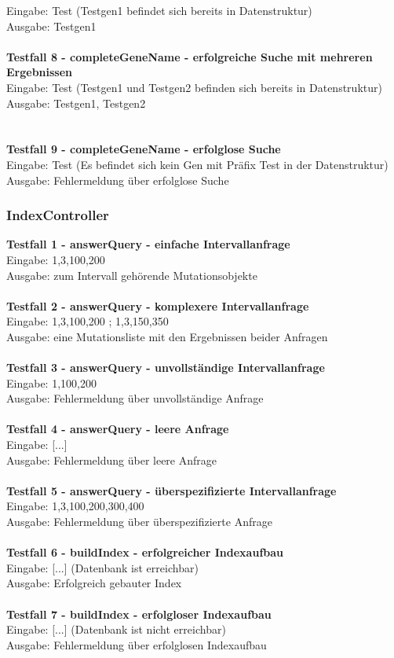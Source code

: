 \documentclass{scrartcl}
\begin{document}
Eingabe: Test (Testgen1 befindet sich bereits in Datenstruktur)\\
Ausgabe: Testgen1\\
\\
\textbf{Testfall 8 - completeGeneName - erfolgreiche Suche mit mehreren Ergebnissen}\\
Eingabe: Test (Testgen1 und Testgen2 befinden sich bereits in Datenstruktur)\\
Ausgabe: Testgen1, Testgen2\\
\\
\newpage\hfill\\
\textbf{Testfall 9 - completeGeneName - erfolglose Suche}\\
Eingabe: Test (Es befindet sich kein Gen mit Präfix Test in der Datenstruktur)\\
Ausgabe: Fehlermeldung über erfolglose Suche
\subsubsection{IndexController}
\textbf{Testfall 1 - answerQuery - einfache Intervallanfrage}\\
Eingabe: 1,3,100,200\\
Ausgabe: zum Intervall gehörende Mutationsobjekte\\
\\
\textbf{Testfall 2 - answerQuery - komplexere Intervallanfrage}\\
Eingabe: 1,3,100,200 ; 1,3,150,350\\
Ausgabe: eine Mutationsliste mit den Ergebnissen beider Anfragen\\
\\
\textbf{Testfall 3 - answerQuery - unvollständige Intervallanfrage}\\
Eingabe: 1,100,200\\
Ausgabe: Fehlermeldung über unvollständige Anfrage\\
\\
\textbf{Testfall 4 - answerQuery - leere Anfrage}\\
Eingabe: [...]\\
Ausgabe: Fehlermeldung über leere Anfrage\\
\\
\textbf{Testfall 5 - answerQuery - überspezifizierte Intervallanfrage}\\
Eingabe: 1,3,100,200,300,400\\
Ausgabe: Fehlermeldung über überspezifizierte Anfrage\\
\\
\textbf{Testfall 6 - buildIndex - erfolgreicher Indexaufbau}\\
Eingabe: [...] (Datenbank ist erreichbar)\\
Ausgabe: Erfolgreich gebauter Index\\
\\
\textbf{Testfall 7 - buildIndex - erfolgloser Indexaufbau}\\
Eingabe: [...] (Datenbank ist nicht erreichbar)\\
Ausgabe: Fehlermeldung über erfolglosen Indexaufbau
\newpage
\end{document}
